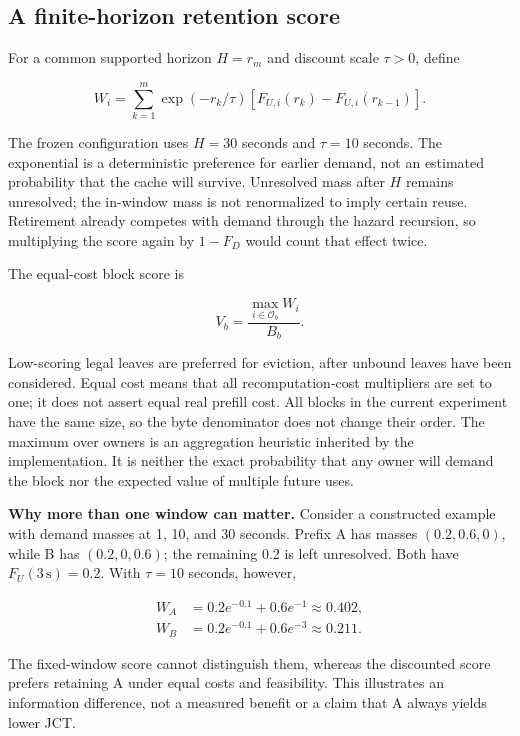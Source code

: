 \documentclass[sigconf, screen, review, balance=false]{acmart}
\begin{document}
\subsection{A finite-horizon retention
score}\label{a-finite-horizon-retention-score}

For a common supported horizon \(H=r_m\) and discount scale \(\tau>0\),
define

\[
W_i=\sum_{k=1}^{m}\exp(-r_k/\tau)
\left[F_{U,i}(r_k)-F_{U,i}(r_{k-1})\right].
\]

The frozen configuration uses \(H=30\) seconds and \(\tau=10\) seconds.
The exponential is a deterministic preference for earlier demand, not an
estimated probability that the cache will survive. Unresolved mass after
\(H\) remains unresolved; the in-window mass is not renormalized to
imply certain reuse. Retirement already competes with demand through the
hazard recursion, so multiplying the score again by \(1-F_D\) would
count that effect twice.

The equal-cost block score is

\[
V_b=\frac{\max_{i\in\mathcal O_b}W_i}{B_b}.
\]

Low-scoring legal leaves are preferred for eviction, after unbound
leaves have been considered. Equal cost means that all
recomputation-cost multipliers are set to one; it does not assert equal
real prefill cost. All blocks in the current experiment have the same
size, so the byte denominator does not change their order. The maximum
over owners is an aggregation heuristic inherited by the implementation.
It is neither the exact probability that any owner will demand the block
nor the expected value of multiple future uses.

\textbf{Why more than one window can matter.} Consider a constructed
example with demand masses at 1, 10, and 30 seconds. Prefix A has masses
\((0.2,0.6,0)\), while B has \((0.2,0,0.6)\); the remaining 0.2 is left
unresolved. Both have \(F_U(3\,\mathrm{s})=0.2\). With \(\tau=10\)
seconds, however,

\[
\begin{aligned}
W_A&=0.2e^{-0.1}+0.6e^{-1}\approx0.402,\\
W_B&=0.2e^{-0.1}+0.6e^{-3}\approx0.211.
\end{aligned}
\]

The fixed-window score cannot distinguish them, whereas the discounted
score prefers retaining A under equal costs and feasibility. This
illustrates an information difference, not a measured benefit or a claim
that A always yields lower JCT.
\end{document}
